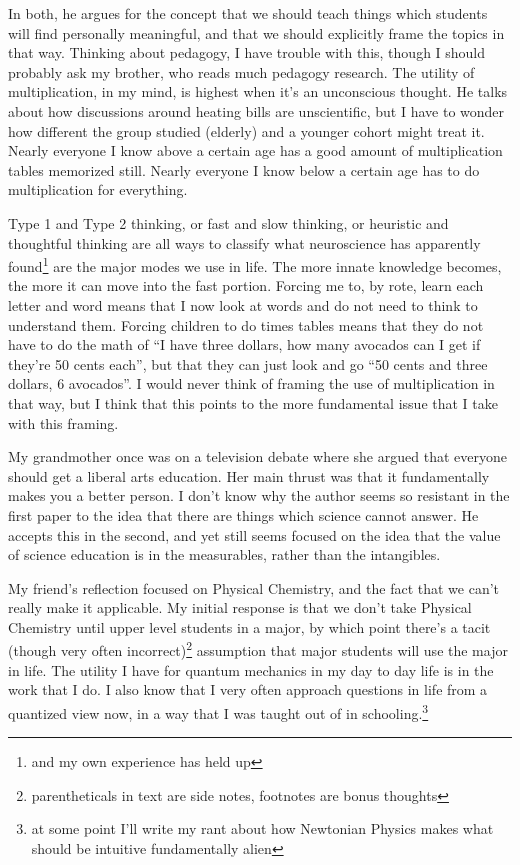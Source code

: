 \documentclass[12pt]{article}
\newcommand{\say}[1]{``#1''}
\renewcommand{\,}{\textsuperscript{,}}
\begin{document}
In both, he argues for the concept that we should teach things which students will find personally meaningful, and that we should explicitly frame the topics in that way.  
Thinking about pedagogy, I have trouble with this, though I should probably ask my brother, who reads much pedagogy research.  
The utility of multiplication, in my mind, is highest when it's an unconscious thought.  
He talks about how discussions around heating bills are unscientific, but I have to wonder how different the group studied (elderly) and a younger cohort might treat it.  
Nearly everyone I know above a certain age has a good amount of multiplication tables memorized still.  
Nearly everyone I know below a certain age has to do multiplication for everything.

Type 1 and Type 2 thinking, or fast and slow thinking, or heuristic and thoughtful thinking are all ways to classify what neuroscience has apparently found\footnote{and my own experience has held up} are the major modes we use in life.  
The more innate knowledge becomes, the more it can move into the fast portion.  
Forcing me to, by rote, learn each letter and word means that I now look at words and do not need to think to understand them.  
Forcing children to do times tables means that they do not have to do the math of \say{I have three dollars, how many avocados can I get if they're 50 cents each}, but that they can just look and go \say{50 cents and three dollars, 6 avocados}.  
I would never think of framing the use of multiplication in that way, but I think that this points to the more fundamental issue that I take with this framing.

My grandmother once was on a television debate where she argued that everyone should get a liberal arts education.  
Her main thrust was that it fundamentally makes you a better person.  
I don't know why the author seems so resistant in the first paper to the idea that there are things which science cannot answer.  
He accepts this in the second, and yet still seems focused on the idea that the value of science education is in the measurables, rather than the intangibles.

My friend's reflection focused on Physical Chemistry, and the fact that we can't really make it applicable.  
My initial response is that we don't take Physical Chemistry until upper level students in a major, by which point there's a tacit (though very often incorrect)\footnote{parentheticals in text are side notes, footnotes are bonus thoughts} assumption that major students will use the major in life.  
The utility I have for quantum mechanics in my day to day life is in the work that I do.  
I also know that I very often approach questions in life from a quantized view now, in a way that I was taught out of in schooling.\footnote{at some point I'll write my rant about how Newtonian Physics makes what should be intuitive fundamentally alien}
\end{document}
